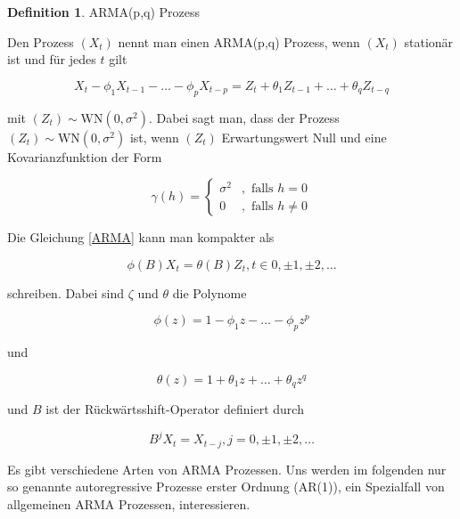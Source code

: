 \documentclass[12pt,a4paper]{article}
\theoremstyle{definition}
\newtheorem{Definition}{Definition}[subsection]
\theoremstyle{definition}
\theoremstyle{definition}
\theoremstyle{definition}
\begin{document}
\begin{Definition}
ARMA(p,q) Prozess

Den Prozess $(X_t)$ nennt man einen ARMA(p,q) Prozess, wenn $(X_t)$ stationär ist und für jedes $t$ gilt

\begin{equation}\label{ARMA}
X_t - \phi_1 X_{t-1} - \ldots - \phi_p X_{t-p} = Z_t + \theta_1 Z_{t-1} + \ldots + \theta_q Z_{t-q}
\end{equation}

mit $(Z_t) \sim \text{WN}(0, \sigma^2)$.  Dabei sagt man, dass der Prozess $(Z_t) \sim \text{WN}(0, \sigma^2)$ ist, wenn $(Z_t)$ Erwartungswert Null und eine Kovarianzfunktion der Form

\begin{equation*}
\gamma(h) = \begin{cases} \sigma^2 &, \text{ falls } h=0 \\ 0 &, \text{ falls } h \neq 0 \end{cases}
\end{equation*}

\end{Definition}

Die Gleichung \eqref{ARMA} kann man kompakter als

\begin{equation*}
\phi(B) X_t = \theta(B) Z_t, t \in 0, \pm 1, \pm 2, \ldots
\end{equation*}

schreiben. Dabei sind $\zeta$ und $\theta$ die Polynome

\begin{equation*}
\phi(z) = 1 - \phi_1 z - \ldots - \phi_p z^p
\end{equation*}

und 

\begin{equation*}
\theta(z) = 1 + \theta_1 z + \ldots + \theta_q z^q
\end{equation*}

und $B$ ist der Rückwärtsshift-Operator definiert durch

\begin{equation*}
B^j X_t = X_{t-j}, j = 0, \pm 1, \pm 2, \ldots
\end{equation*}

Es gibt verschiedene Arten von ARMA Prozessen. Uns werden im folgenden nur so genannte autoregressive Prozesse erster Ordnung (AR(1)), ein Spezialfall von allgemeinen ARMA Prozessen, interessieren.
\end{document}
